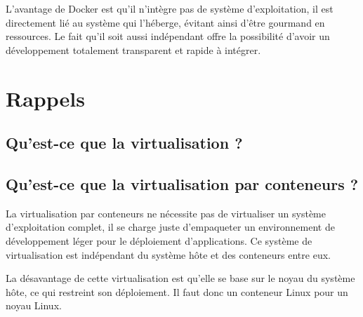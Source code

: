 \documentclass[12pt,a4paper]{article}
\begin{document}
L'avantage de Docker est qu'il n'intègre pas de système d'exploitation, il est directement lié au système qui l'héberge, évitant ainsi d'être gourmand en ressources. Le fait qu'il soit aussi indépendant offre la possibilité d'avoir un développement totalement transparent et rapide à intégrer. 

\section{Rappels}

\subsection{Qu'est-ce que la virtualisation ?}































\subsection{Qu'est-ce que la virtualisation par conteneurs ?}

La virtualisation par conteneurs ne nécessite pas de virtualiser un système d'exploitation complet, il se charge juste d'empaqueter un environnement de développement léger pour le déploiement d'applications. Ce système de virtualisation est indépendant du système hôte et des conteneurs entre eux. 

La désavantage de cette virtualisation est qu'elle se base sur le noyau du système hôte, ce qui restreint son déploiement. Il faut donc un conteneur Linux pour un noyau Linux. 
\end{document}
